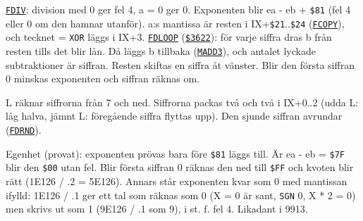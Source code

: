 \begin{Listing}
\Gap
\begin{Cmt}\par\noindent \hyperlink{l:FDIV}{\texttt{FDIV}}: division med 0 ger fel 4, a = 0 ger 0. Exponenten blir ea - eb + \texttt{\$81} (fel 4 eller 0 om den hamnar utanför). a:s mantissa är resten i IX+\texttt{\$21}..\texttt{\$24} (\hyperlink{l:FCOPY}{\texttt{FCOPY}}), och tecknet = \texttt{XOR} läggs i IX+3. \hyperlink{l:FDLOOP}{\texttt{FDLOOP}} (\hyperlink{a:3622}{\texttt{\$3622}}): för varje siffra dras b från resten tills det blir lån. Då läggs b tillbaka (\hyperlink{l:MADD3}{\texttt{MADD3}}), och antalet lyckade subtraktioner är siffran. Resten skiftas en siffra åt vänster. Blir den första siffran 0 minskas exponenten och siffran räknas om.\par
\par\noindent L räknar siffrorna från 7 och ned. Siffrorna packas två och två i IX+0..2 (udda L: låg halva, jämnt L: föregående siffra flyttas upp). Den sjunde siffran avrundar (\hyperlink{l:FDRND}{\texttt{FDRND}}).\par
\par\noindent Egenhet (provat): exponenten prövas bara före \texttt{\$81} läggs till. Är ea - eb = \texttt{\$7F} blir den \texttt{\$00} utan fel. Blir första siffran 0 räknas den ned till \texttt{\$FF} och kvoten blir rätt (1E126 / .2 = 5E126). Annars står exponenten kvar som 0 med mantissan ifylld: 1E126 / .1 ger ett tal som räknas som 0 (X = 0 är sant, \texttt{SGN} 0, X * 2 = 0) men skrivs ut som 1 (9E126 / .1 som 9), i st. f. fel 4. Likadant i 9913.\par\end{Cmt}

\end{Listing}
